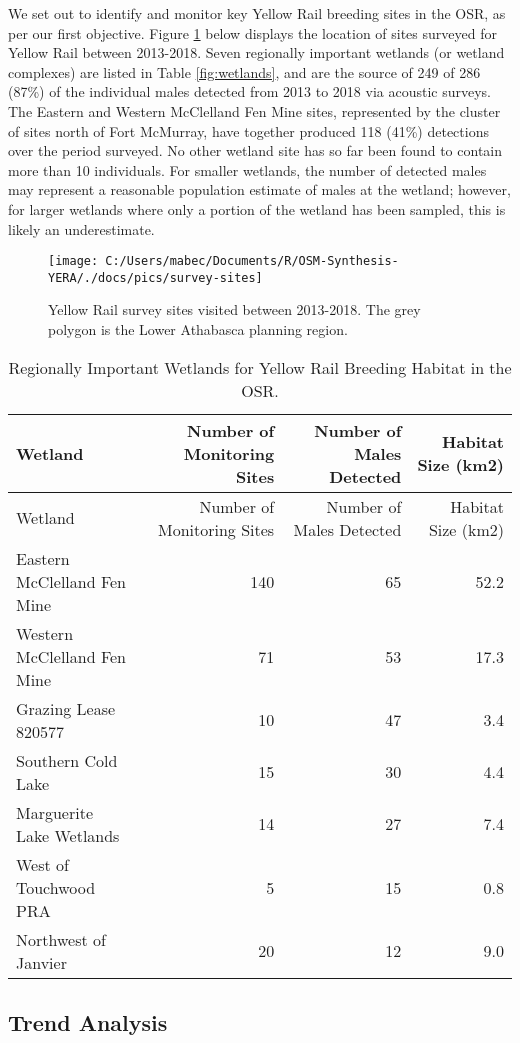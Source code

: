 \documentclass[11pt,]{article}
\begin{document}
We set out to identify and monitor key Yellow Rail breeding sites in the
OSR, as per our first objective. Figure \ref{fig:survey-sites} below
displays the location of sites surveyed for Yellow Rail between
2013-2018. Seven regionally important wetlands (or wetland complexes)
are listed in Table \ref{fig:wetlands}, and are the source of 249 of 286
(87\%) of the individual males detected from 2013 to 2018 via acoustic
surveys. The Eastern and Western McClelland Fen Mine sites, represented
by the cluster of sites north of Fort McMurray, have together produced
118 (41\%) detections over the period surveyed. No other wetland site
has so far been found to contain more than 10 individuals. For smaller
wetlands, the number of detected males may represent a reasonable
population estimate of males at the wetland; however, for larger
wetlands where only a portion of the wetland has been sampled, this is
likely an underestimate.

\begin{figure}[H]

{\centering \texttt{[image: C:/Users/mabec/Documents/R/OSM-Synthesis-YERA/./docs/pics/survey-sites]} 

}

\caption{Yellow Rail survey sites visited between 2013-2018. The grey polygon is the Lower Athabasca planning region.}\label{fig:survey-sites}
\end{figure}

\begin{longtable}[]{@{}lrrr@{}}
\caption{\label{tab:wetlands}Regionally Important Wetlands for Yellow Rail
Breeding Habitat in the OSR.}\tabularnewline
\toprule
Wetland & Number of Monitoring Sites & Number of Males Detected &
Habitat Size (km2)\tabularnewline
\midrule
\endfirsthead
\toprule
Wetland & Number of Monitoring Sites & Number of Males Detected &
Habitat Size (km2)\tabularnewline
\midrule
\endhead
Eastern McClelland Fen Mine & 140 & 65 & 52.2\tabularnewline
Western McClelland Fen Mine & 71 & 53 & 17.3\tabularnewline
Grazing Lease 820577 & 10 & 47 & 3.4\tabularnewline
Southern Cold Lake & 15 & 30 & 4.4\tabularnewline
Marguerite Lake Wetlands & 14 & 27 & 7.4\tabularnewline
West of Touchwood PRA & 5 & 15 & 0.8\tabularnewline
Northwest of Janvier & 20 & 12 & 9.0\tabularnewline
\bottomrule
\end{longtable}

\subsection{Trend Analysis}\label{trend-analysis}
\end{document}
